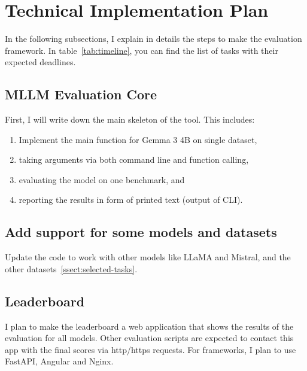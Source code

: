 \documentclass[
	letterpaper, %
]{jdf}
\begin{document}
\section{Technical Implementation Plan}
In the following subsections, I explain in details the steps to make the evaluation framework.
In table~\ref{tab:timeline}, you can find the list of tasks with their expected deadlines.

\subsection{MLLM Evaluation Core}
First, I will write down the main skeleton of the tool.
This includes: 
\begin{enumerate}
         \item Implement the main function for Gemma 3 4B on single dataset,
         \item taking arguments via both command line and function calling,
         \item evaluating the model on one benchmark, and
         \item reporting the results in form of printed text (output of CLI).
              \end{enumerate}
\subsection{Add support for some models and datasets}
Update the code to work with other models like LLaMA and Mistral, and the other datasets~\ref{ssect:selected-tasks}.
\subsection{Leaderboard}
I plan to make the leaderboard a web application that shows the results of the evaluation for all models.
Other evaluation scripts are expected to contact this app with the final scores via http/https requests.
For frameworks, I plan to use FastAPI, Angular and Nginx.
\end{document}
